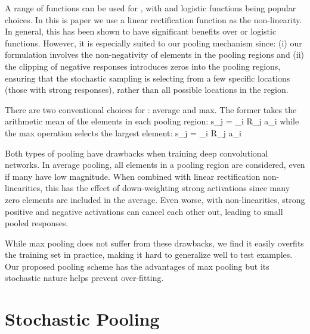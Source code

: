 \documentclass{article} \usepackage{nips12submit_e,times}
\def\BE{\vspace{-0.0mm}}
\begin{document}
A range of functions can be used for , with  and logistic
functions being popular choices. In this is paper we use a linear rectification
function  as the non-linearity. In
general, this has been shown \cite{Nair10} to have significant
benefits over  or logistic functions. However, it is especially
suited to our pooling mechanism since: (i) our formulation involves the non-negativity
of elements in the pooling regions and (ii) the clipping of negative
responses introduces zeros into the pooling regions, ensuring that the
stochastic sampling is selecting from a few specific locations (those
with strong responses), rather than all possible locations in the
region.

There are two conventional choices for : average and max. The
former takes the arithmetic mean of the elements in each pooling
region:
\BE s_j =  \sum_{i \in R_j} a_i \:\:\:  \EE
while the max operation selects the largest element:
\BE s_j = \max_{i \in R_j} a_i
\EE

























Both types of pooling have drawbacks when training deep convolutional
networks. In average pooling, all elements in a pooling region are considered,
even if many have low magnitude. When combined with linear rectification
non-linearities, this has the effect of down-weighting strong
activations since many zero elements are included in the average.
Even worse, with  non-linearities, strong positive and negative activations
can cancel each other out, leading to small pooled responses.

While max pooling does not suffer from these drawbacks, we find it easily overfits the training set
in practice,
making it hard to generalize well to test examples. Our proposed pooling scheme has the
advantages of max pooling but its stochastic nature helps prevent
over-fitting.










\section{Stochastic Pooling}
\end{document}
